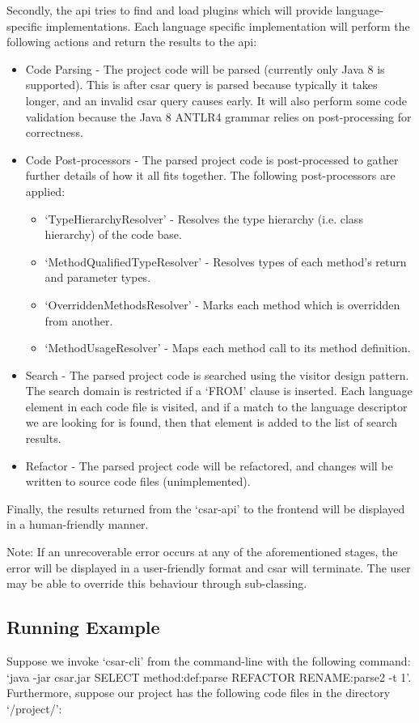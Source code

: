 \documentclass[12pt, letterpaper]{article}
\begin{document}
Secondly, the api tries to find and load plugins which will provide language-specific implementations.
Each language specific implementation will perform the following actions and return the results to the api:

\begin{itemize}
  \item Code Parsing - The project code will be parsed (currently only Java 8 is supported).
  This is after csar query is parsed because typically it takes longer, and an invalid csar query causes early.
  It will also perform some code validation because the Java 8 ANTLR4 grammar relies on post-processing for correctness.
  \item Code Post-processors - The parsed project code is post-processed to gather further details of how it all fits together. The following post-processors are applied:
  \begin{itemize}
    \item `TypeHierarchyResolver' - Resolves the type hierarchy (i.e. class hierarchy) of the code base.
    \item `MethodQualifiedTypeResolver' - Resolves types of each method's return and parameter types.
    \item `OverriddenMethodsResolver' - Marks each method which is overridden from another.
    \item `MethodUsageResolver' - Maps each method call to its method definition.
  \end{itemize}
  \item Search - The parsed project code is searched using the visitor design pattern.
  The search domain is restricted if a `FROM' clause is inserted.
  Each language element in each code file is visited, and if a match to the language descriptor we are looking for is found, then that element is added to the list of search results.
  \item Refactor - The parsed project code will be refactored, and changes will be written to source code files (unimplemented).
\end{itemize}

Finally, the results returned from the `csar-api' to the frontend will be displayed in a human-friendly manner.

Note: If an unrecoverable error occurs at any of the aforementioned stages, the error will be displayed in a user-friendly format and csar will terminate.
The user may be able to override this behaviour through sub-classing.

\subsection{Running Example}
Suppose we invoke `csar-cli' from the command-line with the following command: `java -jar csar.jar SELECT method:def:parse REFACTOR RENAME:parse2 -t 1'.
Furthermore, suppose our project has the following code files in the directory `/project/':
\end{document}
